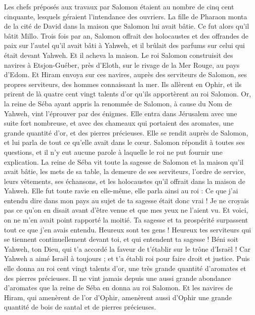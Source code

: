 \begin{multicols}{2}
Les chefs préposés aux travaux par Salomon étaient au nombre de cinq cent cinquante, lesquels géraient l'intendance des ouvriers.
La fille de Pharaon monta de la cité de David dans la maison que Salomon lui avait bâtie. Ce fut alors qu’il bâtit Millo.
Trois fois par an, Salomon offrait des holocaustes et des offrandes de paix sur l'autel qu'il avait bâti à Yahweh, et il brûlait des parfums sur celui qui était devant Yahweh. Et il acheva la maison.
Le roi Salomon construisit des navires à Etsjon-Guéber, près d'Eloth, sur le rivage de la Mer Rouge, au pays d'Edom.
Et Hiram envoya sur ces navires, auprès des serviteurs de Salomon, ses propres serviteurs, des hommes connaissant la mer.
Ils allèrent en Ophir, et ils prirent de là quatre cent vingt talents d'or qu’ils apportèrent au roi Salomon.
\VerseOne{}Or, la reine de Séba ayant appris la renommée de Salomon, à cause du Nom de Yahweh, vint l’éprouver par des énigmes.
Elle entra dans Jérusalem avec une suite fort nombreuse, et avec des chameaux qui portaient des aromates, une grande quantité d'or, et des pierres précieuses. Elle se rendit auprès de Salomon, et lui parla de tout ce qu'elle avait dans le cœur.
Salomon répondit à toutes ses questions, et il n’y eut aucune parole à laquelle le roi ne put fournir une explication.
La reine de Séba vit toute la sagesse de Salomon et la maison qu'il avait bâtie,
les mets de sa table, la demeure de ses serviteurs, l’ordre de service, leurs vêtements, ses échansons, et les holocaustes qu'il offrait dans la maison de Yahweh.
Elle fut toute ravie en elle-même, elle parla ainsi au roi : Ce que j'ai entendu dire dans mon pays au sujet de ta sagesse était donc vrai !
Je ne croyais pas ce qu’on en disait avant d’être venue et que mes yeux ne l'aient vu. Et voici, on ne m'en avait point rapporté la moitié. Ta sagesse et ta prospérité surpassent tout ce que j'en avais entendu.
Heureux sont tes gens ! Heureux tes serviteurs qui se tiennent continuellement devant toi, et qui entendent ta sagesse !
Béni soit Yahweh, ton Dieu, qui t’a accordé la faveur de t’établir sur le trône d'Israël ! Car Yahweh a aimé Israël à toujours ; et t'a établi roi pour faire droit et justice.
Puis elle donna au roi cent vingt talents d'or, une très grande quantité d’aromates et des pierres précieuses. Il ne vint jamais depuis une aussi grande abondance d’aromates que la reine de Séba en donna au roi Salomon.
Et les navires de Hiram, qui amenèrent de l'or d'Ophir, amenèrent aussi d’Ophir une grande quantité de bois de santal et de pierres précieuses.

\end{multicols}
